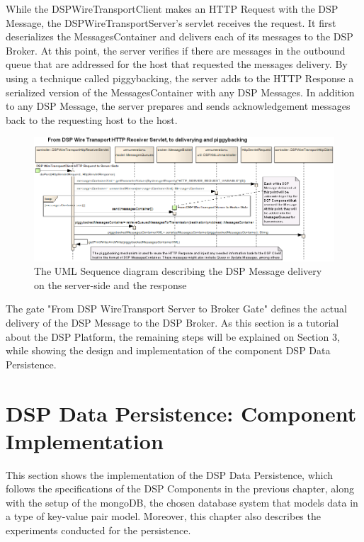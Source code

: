 While the DSPWireTransportClient makes an HTTP Request with the DSP Message,
the DSPWireTransportServer's servlet receives the request. It first
deserializes the MessagesContainer and delivers each of its messages to the DSP
Broker. At this point, the server verifies if there are messages in the
outbound queue that are addressed for the host that requested the messages
delivery. By using a technique called piggybacking, the server adds to the HTTP
Response a serialized version of the MessagesContainer with any DSP Messages.
In addition to any DSP Message, the server prepares and sends acknowledgement
messages back to the requesting host to the host.

\begin{figure}[!t]
  \centering
  \includegraphics[scale=0.5]{../diagrams/From-DSPWireTransport-Server-To-DSP-Broker}
  \caption{The UML Sequence diagram describing the DSP
Message delivery on the server-side and the response}
  \label{fig:From-DSPWireTransport-Server-To-DSP-Broker}
\end{figure}

The gate "From DSP WireTransport Server to Broker Gate" defines the actual
delivery of the DSP Message to the DSP Broker. As this section is a tutorial
about the DSP Platform, the remaining steps will be explained on Section 3,
while showing the design and implementation of the component DSP Data
Persistence.

\section{DSP Data Persistence: Component Implementation}
\label{sec:dsp-data-persistence-implementation}

This section shows the implementation of the DSP Data Persistence, which
follows the specifications of the DSP Components in the previous chapter,
along with the setup of the mongoDB, the chosen database system that models
data in a type of key-value pair model. Moreover, this chapter also describes
the experiments conducted for the persistence.

